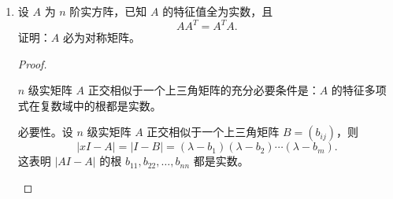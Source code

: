 \begin{enumerate}[1~]
\begin{solution}
\begin{align*}
\begin{matrix}
	0&		1&		0\\
	0&		0&		5^n\\
\end{matrix} \right)
\left(
\begin{array}{ccc}
 0 & -\frac{2}{5} & \frac{1}{5} \\
 1 & 0 & -1 \\
 0 & \frac{2}{5} & \frac{4}{5} \\
\end{array}
\right) \\
&=\left(
\begin{array}{ccc}
 1 & 2\cdot 5^{n-1}-2 (-1)^n 5^{n-1} & -1+4\cdot 5^{n-1}+(-1)^n 5^{n-1} \\
 0 & 5^{n-1}+4 (-1)^n 5^{n-1} & 2\cdot 5^{n-1}-2 (-1)^n 5^{n-1} \\
 0 & 2\cdot 5^{n-1}-2 (-1)^n 5^{n-1} & 4\cdot 5^{n-1}+(-1)^n 5^{n-1} \\
\end{array}
\right).
\end{align*}
\end{solution}
\item[六、]
设 $A$ 为 $n$ 阶实方阵，已知 $A$ 的特征值全为实数，且\[
A A ^ { T } = A ^ { T } A.
\]
证明：$A$ 必为对称矩阵。
\begin{proof}
\begin{lemma}\label{shijuzhenzhengjiaoxiangsishangsanjiao}
$n$ 级实矩阵 $A$ 正交相似于一个上三角矩阵的充分必要条件是：$A$ 的特征多项式在复数域中的根都是实数。
\end{lemma}
\begin{subproof}
必要性。设 $n$ 级实矩阵 $A$ 正交相似于一个上三角矩阵 $B = (b_{ij})$，则 \[
|x I - A| = |I - B| = (\lambda - b_1) (\lambda - b_2) \cdots (\lambda - b_m).\]
这表明 $|A I - A|$ 的根 $b_{11}, b_{22}, \dots, b_{nn}$ 都是实数。


\end{subproof}
\end{proof}
\end{enumerate}
